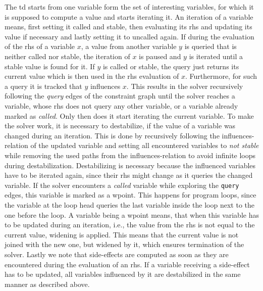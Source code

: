   \noindent The \ac{td} starts from one variable form the set of interesting variables, for which it is supposed to compute a value and starts iterating it. An iteration of a variable means, first setting it called and stable, then evaluating its \ac{rhs} and updating its value if necessary and lastly setting it to uncalled again. If during the evaluation of the \ac{rhs} of a variable $x$, a value from another variable $y$ is queried that is neither called nor stable, the iteration of $x$ is paused and $y$ is iterated until a stable value is found for it. If $y$ is called or stable, the query just returns its current value which is then used in the \ac{rhs} evaluation of $x$. Furthermore, for such a query it is tracked that $y$ influences $x$. This results in the solver recursively following the \textit{query} edges of the constraint graph until the solver reaches a variable, whose \ac{rhs} does not query any other variable, or a variable already marked as \textit{called}. Only then does it start iterating the current variable.
  To make the solver work, it is necessary to destabilize, if the value of a variable was changed during an iteration. This is done by recursively following the influences-relation of the updated variable and setting all encountered variables to \textit{not stable} while removing the used paths from the influences-relation to avoid infinite loops during destabilization. Destabilizing is necessary because the influenced variables have to be iterated again, since their \ac{rhs} might change as it queries the changed variable.
  If the solver encounters a \textit{called} variable while exploring the \texttt{query} edges, this variable is marked as a wpoint. This happens for program loops, since the variable at the loop head queries the last variable inside the loop next to the one before the loop. A variable being a wpoint means, that when this variable has to be updated during an iteration, i.e., the value from the \ac{rhs} is not equal to the current value, widening is applied. This means that the current value is not joined with the new one, but widened by it, which ensures termination of the solver. 
  Lastly we note that side-effects are computed as soon as they are encountered during the evaluation of an \ac{rhs}. If a variable receiving a side-effect has to be updated, all variables influenced by it are destabilized in the same manner as described above.
